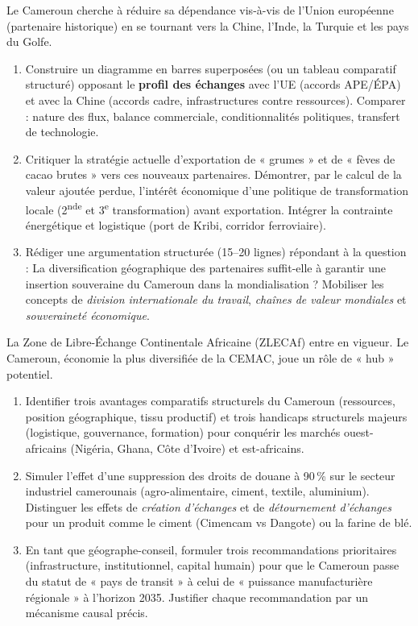 \documentclass[11pt]{article}
\begin{document}
\begin{exercice}
Le Cameroun cherche à réduire sa dépendance vis-à-vis de l'Union européenne (partenaire historique) en se tournant vers la Chine, l'Inde, la Turquie et les pays du Golfe.

\begin{enumerate}
    \item Construire un diagramme en barres superposées (ou un tableau comparatif structuré) opposant le \textbf{profil des échanges} avec l'UE (accords APE/ÉPA) et avec la Chine (accords cadre, infrastructures contre ressources). Comparer : nature des flux, balance commerciale, conditionnalités politiques, transfert de technologie.
    \item Critiquer la stratégie actuelle d'exportation de « grumes » et de « fèves de cacao brutes » vers ces nouveaux partenaires. Démontrer, par le calcul de la valeur ajoutée perdue, l'intérêt économique d'une politique de transformation locale (2\textsuperscript{nde} et 3\textsuperscript{e} transformation) avant exportation. Intégrer la contrainte énergétique et logistique (port de Kribi, corridor ferroviaire).
    \item Rédiger une argumentation structurée (15--20 lignes) répondant à la question : \og La diversification géographique des partenaires suffit-elle à garantir une insertion souveraine du Cameroun dans la mondialisation ? \fg Mobiliser les concepts de \textit{division internationale du travail}, \textit{chaînes de valeur mondiales} et \textit{souveraineté économique}.
\end{enumerate}
\end{exercice}

\begin{exercice}
La Zone de Libre-Échange Continentale Africaine (ZLECAf) entre en vigueur. Le Cameroun, économie la plus diversifiée de la CEMAC, joue un rôle de « hub » potentiel.

\begin{enumerate}
    \item Identifier trois avantages comparatifs structurels du Cameroun (ressources, position géographique, tissu productif) et trois handicaps structurels majeurs (logistique, gouvernance, formation) pour conquérir les marchés ouest-africains (Nigéria, Ghana, Côte d'Ivoire) et est-africains.
    \item Simuler l'effet d'une suppression des droits de douane à 90\,\% sur le secteur industriel camerounais (agro-alimentaire, ciment, textile, aluminium). Distinguer les effets de \textit{création d'échanges} et de \textit{détournement d'échanges} pour un produit comme le ciment (Cimencam vs Dangote) ou la farine de blé.
    \item En tant que géographe-conseil, formuler trois recommandations prioritaires (infrastructure, institutionnel, capital humain) pour que le Cameroun passe du statut de « pays de transit » à celui de « puissance manufacturière régionale » à l'horizon 2035. Justifier chaque recommandation par un mécanisme causal précis.
\end{enumerate}
\end{exercice}
\end{document}
